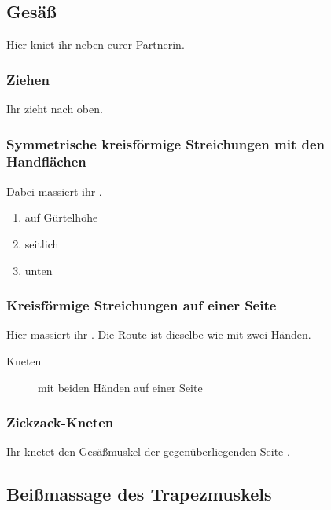 \subsection{Gesäß}

Hier kniet ihr neben eurer Partnerin.

\subsubsection{Ziehen}

Ihr zieht  nach oben.

\subsubsection{Symmetrische kreisförmige Streichungen mit den Handflächen}

Dabei massiert ihr .

\begin{oframed}
  \begin{enumerate}
    \item auf Gürtelhöhe 
    \item seitlich 
    \item unten 
  \end{enumerate}
\end{oframed}

\subsubsection{Kreisförmige Streichungen auf einer Seite}

Hier massiert ihr . Die Route ist dieselbe wie mit zwei Händen.

\begin{description}
  \item [Kneten] mit beiden Händen auf einer Seite
\end{description}


\subsubsection{Zickzack-Kneten}

Ihr knetet den Gesäßmuskel der gegenüberliegenden Seite .


\subsection{Beißmassage des Trapezmuskels}

